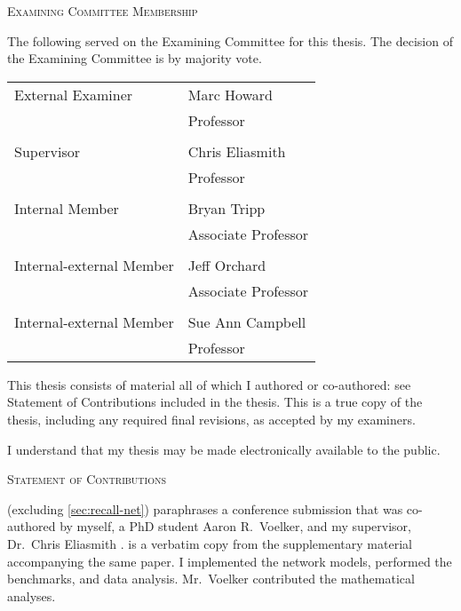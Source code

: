 \begin{center}\textsc{Examining Committee Membership}\end{center}
The following served on the Examining Committee for this thesis.
The decision of the Examining Committee is by majority vote.

\noindent\begin{tabular}{@{}ll}\\
    External Examiner & Marc Howard \\ & Professor \\ \\
    Supervisor & Chris Eliasmith \\ & Professor \\ \\
    Internal Member & Bryan Tripp \\ & Associate Professor \\ \\
    Internal-external Member & Jeff Orchard \\ & Associate Professor \\ \\
    Internal-external Member & Sue Ann Campbell \\ & Professor
\end{tabular}

\cleardoublepage


  \noindent
  This thesis consists of material all of which I authored or co-authored: see Statement of Contributions included in the thesis.
  This is a true copy of the thesis, including any required final revisions, as accepted by my examiners.

  \bigskip
  
  \noindent
I understand that my thesis may be made electronically available to the public.

\cleardoublepage

\begin{center}\textsc{Statement of Contributions}\end{center}
 (excluding \cref{sec:recall-net}) paraphrases a conference submission that was co-authored by myself, a PhD student Aaron R.\ Voelker, and my supervisor, Dr.\ Chris Eliasmith \parencite{jangosmann2017}.
 is a verbatim copy from the supplementary material accompanying the same paper.
I implemented the network models, performed the benchmarks, and data analysis.
Mr.~Voelker contributed the mathematical analyses.

